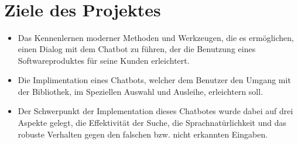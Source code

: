 \documentclass[12pt,a4paper]{scrartcl}
\begin{document}
\pagestyle{empty}

\begin{titlepage}
\begin{center}
 \\
\vspace{5cm}
 \\
\vspace{11cm}
 \\
\vspace{1cm}
 \\
\end{center}
\end{titlepage}


\newpage
\tableofcontents
\newpage

\section{Ziele des Projektes}
\begin{itemize}
\item Das Kennenlernen moderner Methoden und Werkzeugen, die es ermöglichen, einen Dialog mit dem Chatbot zu führen, der die Benutzung eines Softwareproduktes für seine Kunden erleichtert.
\item Die Implimentation eines Chatbots, welcher dem Benutzer den Umgang mit der Bibliothek, im Speziellen Auswahl und Ausleihe, erleichtern soll.\\
\item Der Schwerpunkt der Implementation dieses Chatbotes wurde dabei auf drei Aspekte gelegt, die Effektivität der Suche, die Sprachnatürlichkeit und das robuste Verhalten gegen den falschen bzw. nicht erkannten Eingaben.
\end{itemize}
\newpage
\end{document}
